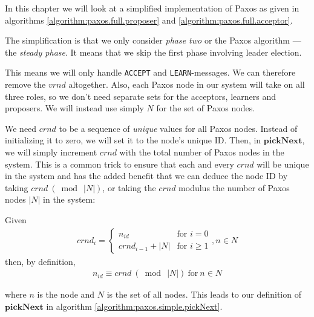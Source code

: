 In this chapter we will look at a simplified implementation of Paxos as
given in algorithms \ref{algorithm:paxos.full.proposer} and
\ref{algorithm:paxos.full.acceptor}.

The simplification is that we only consider \textit{phase two} or the Paxos
algorithm \cite{Lam01}---the \textit{steady phase}.
%
It means that we skip the first phase involving leader election.

This means we will only handle
\texttt{ACCEPT} and \texttt{LEARN}-messages.  We can therefore remove the
$vrnd$ altogether.  Also, each Paxos node in our system will take on all
three roles, so we don't need separate sets for the acceptors, learners and
proposers. We will instead use simply $N$ for the set of Paxos nodes.


We need $crnd$ to be a sequence of \textit{unique} values for all Paxos
nodes.
Instead of initializing it to zero, we will set it to the node's
unique ID.  Then, in $\textbf{pickNext}$, we will simply increment $crnd$
with the total number of Paxos nodes in the system.  This
is a common trick to ensure that each and every $crnd$ will be unique in the
system and has
the added benefit that we can deduce the node ID by taking
$crnd\ (\bmod\ |N|)$, or taking the $crnd$ modulus the number of Paxos nodes
$|N|$ in the system:

Given
\begin{gather}
  crnd_i = \left\{
             \begin{array}{ll}
               n_{id} & \mbox{for } i = 0 \\
               crnd_{i-1} + |N| & \mbox{for } i \geq 1
             \end{array}
           \right. , n \in N
  \label{equation:crnd_i}
\end{gather}
then, by definition,
\begin{gather}
  n_{id} \equiv crnd\ (\bmod\ |N|)\ \text{for}\ n \in N
  \label{equation:crnd_mod_N}
\end{gather}

where $n$ is the node and $N$ is the set of all nodes.  This leads to our
definition of $\textbf{pickNext}$ in algorithm
\ref{algorithm:paxos.simple.pickNext}.

